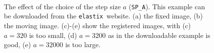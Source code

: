 \documentclass[]{report}
\newcommand{\elastix}{\texttt{elastix}}
\begin{document}
\begin{figure}
\centering
{}\label{sfig:stepsize:fixed}
\label{sfig:stepsize:moving} \\
\label{sfig:stepsize:a320}
\label{sfig:stepsize:a3200}
\label{sfig:stepsize:a32000}
\caption{The effect of the choice of the step size $a$
(\texttt{SP\_A}). This example can be downloaded from the
\elastix\ website. (a) the fixed image, (b) the moving image.
(c)-(e) show the registered images, with (c) $a = 320$ is too
small, (d) $a = 3200$ as in the downloadable example is good, (e)
$a = 32000$ is too large.} \label{fig:stepsize}
\end{figure}
\end{document}
